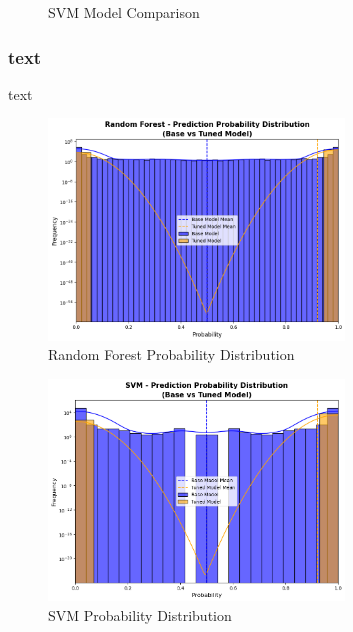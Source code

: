 \begin{figure}[h]
\begin{minipage}[c]{0.47\textwidth}
                    \caption{SVM Model Comparison}
                    \label{fig:logistic_cm}
                \end{minipage}
            \end{figure}
        
        \subsubsection{text \\} %
        
            text %
            
            \begin{figure}[H]
                \centering
                \includegraphics[width=0.7\textwidth]{../figures/plots/section2/Random_Forest_Probability_distribution.png}
                \caption{Random Forest Probability Distribution}
                \label{fig:rf-probability-distribution}
            \end{figure}
            
            \begin{figure}[H]
                \centering
                \includegraphics[width=0.7\textwidth]{../figures/plots/section2/SVM_Probability_distribution.png}
                \caption{SVM Probability Distribution}
                \label{fig:svm-probability-distribution}
            \end{figure}
                
        \clearpage %
        